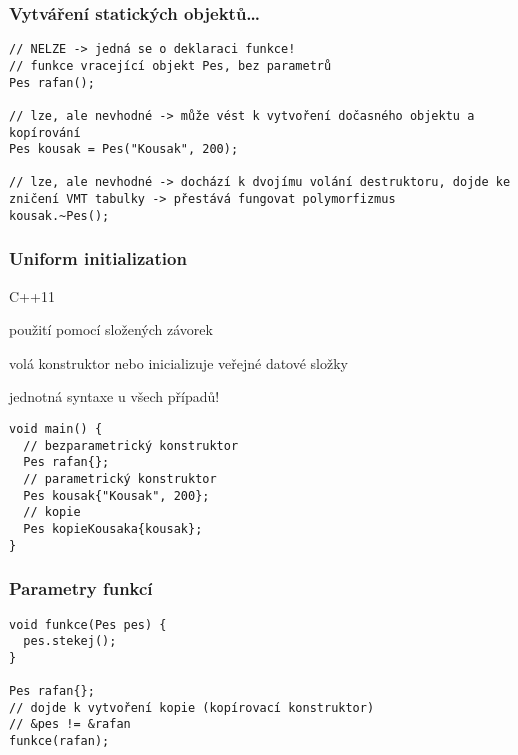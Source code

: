 \begin{frame}[fragile]
\frametitle{Vytváření statických objektů\ldots}
\begin{noblock}
\begin{lstlisting}
// NELZE -> jedná se o deklaraci funkce!
// funkce vracející objekt Pes, bez parametrů
Pes rafan(); 

// lze, ale nevhodné -> může vést k vytvoření dočasného objektu a kopírování
Pes kousak = Pes("Kousak", 200);

// lze, ale nevhodné -> dochází k dvojímu volání destruktoru, dojde ke zničení VMT tabulky -> přestává fungovat polymorfizmus
kousak.~Pes();
\end{lstlisting}
\end{noblock}
\end{frame}



\begin{frame}[fragile]
\frametitle{Uniform initialization}
\begin{bitemize}
\item C++11
\item použití pomocí složených závorek
\item volá konstruktor nebo inicializuje veřejné datové složky
\item jednotná syntaxe u všech případů!
\end{bitemize}

\begin{yesblock}
\begin{lstlisting}
void main() {
  // bezparametrický konstruktor
  Pes rafan{};
  // parametrický konstruktor
  Pes kousak{"Kousak", 200};
  // kopie
  Pes kopieKousaka{kousak};
}
\end{lstlisting}
\end{yesblock}
\end{frame}




\begin{frame}[fragile]
\frametitle{Parametry funkcí}

\begin{yesblock}
\begin{lstlisting}
void funkce(Pes pes) {
  pes.stekej();
}

Pes rafan{};
// dojde k vytvoření kopie (kopírovací konstruktor)
// &pes != &rafan
funkce(rafan);
\end{lstlisting}
\end{yesblock}
\end{frame}


